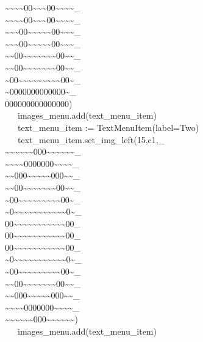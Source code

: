 {\~{}\~{}\~{}\~{}00\~{}\~{}\~{}00\~{}\~{}\~{}\~{}\_ \\
\~{}\~{}\~{}\~{}00\~{}\~{}\~{}00\~{}\~{}\~{}\~{}\_ \\
\~{}\~{}\~{}00\~{}\~{}\~{}\~{}\~{}00\~{}\~{}\~{}\_ \\
\~{}\~{}\~{}00\~{}\~{}\~{}\~{}\~{}00\~{}\~{}\~{}\_ \\
\~{}\~{}00\~{}\~{}\~{}\~{}\~{}\~{}\~{}00\~{}\~{}\_ \\
\~{}\~{}00\~{}\~{}\~{}\~{}\~{}\~{}\~{}00\~{}\~{}\_ \\
\~{}00\~{}\~{}\~{}\~{}\~{}\~{}\~{}\~{}\~{}00\~{}\_ \\
\~{}0000000000000\~{}\_ \\
000000000000000{\textquotedbl}) \\
\>   \ \ \ images\_menu.add(text\_menu\_item) \\
\>   \ \ \ text\_menu\_item :=
TextMenuItem({\textquotedbl}label=Two{\textquotedbl}) \\
\>   \ \ \ text\_menu\_item.set\_img\_left({\textquotedbl}15,c1,\_ \\
\~{}\~{}\~{}\~{}\~{}\~{}000\~{}\~{}\~{}\~{}\~{}\~{}\_ \\
\~{}\~{}\~{}\~{}0000000\~{}\~{}\~{}\~{}\_ \\
\~{}\~{}000\~{}\~{}\~{}\~{}\~{}000\~{}\~{}\_ \\
\~{}\~{}00\~{}\~{}\~{}\~{}\~{}\~{}\~{}00\~{}\~{}\_ \\
\~{}00\~{}\~{}\~{}\~{}\~{}\~{}\~{}\~{}\~{}00\~{}\_ \\
\~{}0\~{}\~{}\~{}\~{}\~{}\~{}\~{}\~{}\~{}\~{}\~{}0\~{}\_ \\
00\~{}\~{}\~{}\~{}\~{}\~{}\~{}\~{}\~{}\~{}\~{}00\_ \\
00\~{}\~{}\~{}\~{}\~{}\~{}\~{}\~{}\~{}\~{}\~{}00\_ \\
00\~{}\~{}\~{}\~{}\~{}\~{}\~{}\~{}\~{}\~{}\~{}00\_ \\
\~{}0\~{}\~{}\~{}\~{}\~{}\~{}\~{}\~{}\~{}\~{}\~{}0\~{}\_ \\
\~{}00\~{}\~{}\~{}\~{}\~{}\~{}\~{}\~{}\~{}00\~{}\_ \\
\~{}\~{}00\~{}\~{}\~{}\~{}\~{}\~{}\~{}00\~{}\~{}\_ \\
\~{}\~{}000\~{}\~{}\~{}\~{}\~{}000\~{}\~{}\_ \\
\~{}\~{}\~{}\~{}0000000\~{}\~{}\~{}\~{}\_ \\
\~{}\~{}\~{}\~{}\~{}\~{}000\~{}\~{}\~{}\~{}\~{}\~{}{\textquotedbl}) \\
\>   \ \ \ images\_menu.add(text\_menu\_item) \\
}
